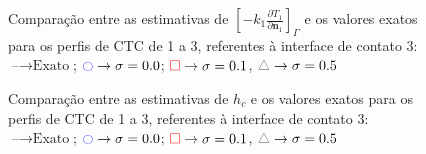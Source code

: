 %
\begin{figure}[h!b]
	\caption{Comparação entre as estimativas de $\left[-k_1 \frac{\partial T_1}{\partial\mathbf{n}_1}\right]_\Gamma$ e os valores exatos para os perfis de CTC de 1 a 3, referentes à interface de contato 3: $\text{--} \rightarrow \text{Exato}$; $\textcolor{blue}{\ocircle} \rightarrow \sigma = 0.0$; $\textcolor{red}{\square} \rightarrow \sigma = 0.1$, $\textcolor{gray}{\triangle} \rightarrow \sigma = 0.5$}
\end{figure}
%
%
\begin{figure}[h!b]
	\caption{Comparação entre as estimativas de $h_c$ e os valores exatos para os perfis de CTC de 1 a 3, referentes à interface de contato 3: $\text{--} \rightarrow \text{Exato}$; $\textcolor{blue}{\ocircle} \rightarrow \sigma = 0.0$; $\textcolor{red}{\square} \rightarrow \sigma = 0.1$, $\textcolor{gray}{\triangle} \rightarrow \sigma = 0.5$}
\end{figure}







